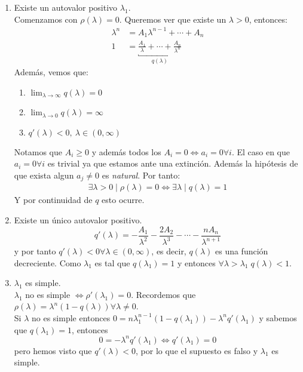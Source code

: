 \begin{enumerate}[1)]
    \item Existe un autovalor positivo $\lambda_1$.\\
    Comenzamos con $\rho(\lambda)=0$. Queremos ver que existe un $\lambda > 0$, entonces:
    \begin{align*}
        \lambda^n &= A_1\lambda^{n-1} + \cdots + A_n\\
        1 &= \underbracket{\frac{A_1}{\lambda} + \cdots + \frac{A_n}{\lambda^n}}_{q(\lambda)}
    \end{align*}
    Además, vemos que:
    \begin{enumerate}[i]
        \item $\lim_{\lambda\to\infty} q(\lambda) = 0$
        \item $\lim_{\lambda\to 0} q(\lambda) = \infty$
        \item $q'(\lambda) < 0,\ \lambda \in (0, \infty)$
    \end{enumerate}
    Notamos que $A_i \geq 0$ y además todos los $A_i = 0 \iff a_i = 0 \forall i$.
    El caso en que $a_i = 0 \forall i$ es trivial ya que estamos ante una extinción.
    Además la hipótesis de que exista algun $a_j \neq 0$ es \textit{natural}. Por tanto:
    \begin{align*}
        \exists \lambda > 0 \mid \rho(\lambda) = 0 \iff \exists \lambda \mid q(\lambda) = 1
    \end{align*}
    Y por continuidad de $q$ esto ocurre.
    \item Existe un único autovalor positivo.\\
    $$q'(\lambda) = - \frac{A_1}{\lambda^2} - \frac{2A_2}{\lambda^3} - \cdots - \frac{nA_n}{\lambda^{n+1}}$$
    y por tanto $q'(\lambda) < 0 \forall \lambda \in (0, \infty)$, es decir, $q(\lambda)$ es una función decreciente. Como $\lambda_1$ es tal que $q(\lambda_1) = 1$ y entonces $\forall \lambda > \lambda_1\; q(\lambda) < 1$.
    \item $\lambda_1$ es simple.\\
    $\lambda_1$ no es simple $\iff \rho'(\lambda_1) = 0$. Recordemos que $\rho(\lambda) = \lambda^n(1-q(\lambda)) \forall \lambda \neq 0$.\\
    Si $\lambda$ no es simple entonces $0 = n\lambda_1^{n-1}(1-q(\lambda_1)) - \lambda^nq'(\lambda_1)$ y sabemos que $q(\lambda_1) = 1$, entonces
    $$
        0 = -\lambda^nq'(\lambda_1) \iff q'(\lambda_1) = 0
    $$
    pero hemos visto que $q'(\lambda) < 0$, por lo que el supuesto es falso y $\lambda_1$ es simple.

\end{enumerate}
